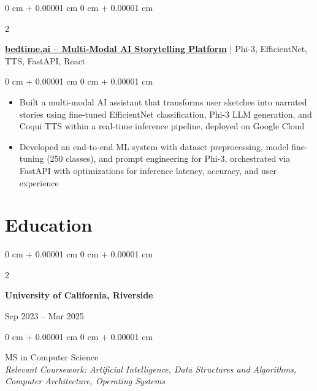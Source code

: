 \documentclass[10pt, letterpaper]{article}
\newenvironment{highlights}{
    \begin{itemize}[
        topsep=0.10 cm,
        parsep=0.10 cm,
        partopsep=0pt,
        itemsep=0pt,
        leftmargin=0 cm + 10pt
    ]
}{
    \end{itemize}
} %
\newenvironment{onecolentry}{
    \begin{adjustwidth}{
        0 cm + 0.00001 cm
    }{
        0 cm + 0.00001 cm
    }
}{
    \end{adjustwidth}
} %
\newenvironment{twocolentry}[2][]{
    \onecolentry
    \def\secondColumn{#2}
    \setcolumnwidth{\fill, 4.5 cm}
    \begin{paracol}{2}
}{
    \switchcolumn \raggedleft \secondColumn
    \end{paracol}
    \endonecolentry
} %
\renewenvironment{highlights}{
    \begin{itemize}[
        topsep=0.05cm,
        parsep=0.10cm,
        partopsep=1pt,
        itemsep=0pt,
        leftmargin=0cm + 10pt
    ]
}{
    \end{itemize}
}
\begin{document}
\begin{twocolentry}{2025}
\textbf{\href{https://github.com/notquite28/bedtime.ai}{bedtime.ai – Multi-Modal AI Storytelling Platform}} |  Phi-3, EfficientNet, TTS, FastAPI, React
\end{twocolentry}
\vspace{0.05cm}
\begin{onecolentry}
\begin{highlights}
\item Built a multi-modal AI assistant that transforms user sketches into narrated stories using fine-tuned EfficientNet classification, Phi-3 LLM generation, and Coqui TTS within a real-time inference pipeline, deployed on Google Cloud
\item Developed an end-to-end ML system with dataset preprocessing, model fine-tuning (250 classes), and prompt engineering for Phi-3, orchestrated via FastAPI with optimizations for inference latency, accuracy, and user experience
\end{highlights}
\end{onecolentry}

\vspace{0.3cm}
\section{Education}
\begin{twocolentry}{Sep 2023 -- Mar 2025}
\textbf{University of California, Riverside}
\end{twocolentry}
\vspace{0.05cm}
\begin{onecolentry}
MS in Computer Science \\
\textit{Relevant Coursework: Artificial Intelligence, Data Structures and Algorithms, Computer Architecture, Operating Systems}
\end{onecolentry}
\end{document}
